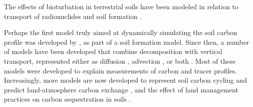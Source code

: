 \documentclass[11pt, oneside, a4paper]{article}   	%
\begin{document}
The effects of bioturbation in terrestrial soils have been modeled in relation to
transport of radionuclides \citep[e.g.][]{Muller1996, Kaste2007, Bunzl2002} and soil formation \citep{Kirkby1977, Salvador2007}.

Perhaps the first model truly aimed at dynamically simulating the soil carbon profile
was developed by \citet{Kirkby1977}, as part of a soil formation model. Since then, a
number of models have been developed that combine decomposition with vertical
transport, represented either as diffusion \citep{OBrien1978, vanDam1997, Koven2009}, advection \citep{Nakane1978, Dorr1989, Bosatta1996, Feng1999, Baisden2002, Jenkinson2008}, or both \citep{Elzein1995, Bruun2007, Freier2010, Guenet2013, Koven2013BGS, Braakhekke2011, Braakhekke2013}. Most of these models were developed to
explain measurements of carbon and tracer profiles. Increasingly, more models are now developed to represent soil carbon cycling and predict land-atmosphere carbon exchange \citep{Huang2018, Koven2013BGS, Tifafi2018, Ahrens2020, Luo2020, Wang2021, Tao2023}, and the effect of land management practices on carbon sequestration in soils \citep{Jenkinson2008, Taghizadeh2014, Keyvanshokouhi2019, Mary2020}.
\end{document}

